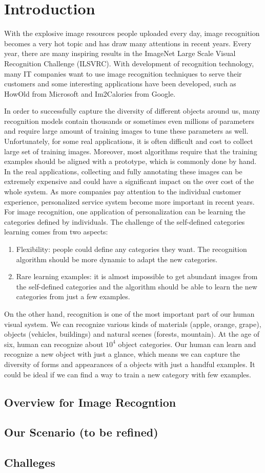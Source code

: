 \chapter{Introduction}\label{sec:intro}
With the explosive image resources people uploaded every day, image recognition becomes a very hot topic and has draw many attentions in recent years. Every year, there are many inspiring results in the ImageNet Large Scale Visual Recognition Challenge (ILSVRC). 
With development of recognition technology, many IT companies want to use image recognition techniques to serve their customers and some interesting applications have been developed, such as HowOld from Microsoft and Im2Calories from Google.

In order to successfully capture the diversity of different objects around us, many recognition models contain thousands or sometimes even millions of parameters and require large amount of training images to tune these parameters as well.
Unfortunately, for some real applications, it is often difficult and cost to collect large set of training images. Moreover, most algorithms require that the training examples should be aligned with a prototype, which is commonly done by hand. In the real applications, collecting and fully annotating these images can be extremely expensive and could have a significant impact on the over cost of the whole system. As more companies pay attention to the individual customer experience, personalized service system become more important in recent years. For image recognition, one application of personalization can be learning the categories defined by individuals. The challenge of the self-defined categories learning comes from two aspects:
\begin{enumerate}
	\item Flexibility: people could define any categories they want. The recognition algorithm should be more dynamic to adapt the new categories.
	\item Rare learning examples: it is almost impossible to get abundant images from the self-defined categories and the algorithm should be able to learn the new categories from just a few examples.
\end{enumerate} 

On the other hand, recognition is one of the most important part of our human visual system. We can recognize various kinds of materials (apple, orange, grape), objects (vehicles, buildings) and natural scenes (forests, mountain). At the age of six, human can recognize about $10^4$ object categories\cite{biederman1987recognition}. 
Our human can learn and recognize a new object with just a glance, which means we can capture the diversity of forms and appearances of a objects with just a handful examples. It could be ideal if we can find a way to train a new category with few examples.

\section{Overview for Image Recogntion}\label{sec:intro:over}

\section{Our Scenario (to be refined)}

\section{Challeges}
